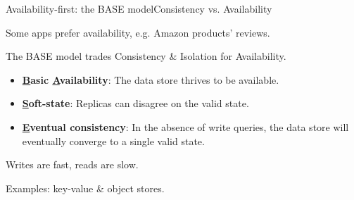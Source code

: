 \begin{frame}{Availability-first: the BASE model}{Consistency vs. Availability}


Some apps prefer availability, e.g. Amazon products' reviews.
\vfill 

The BASE model trades Consistency \& Isolation for Availability.



\vfill

\begin{itemize}
	\item \textbf{\underline{B}asic \underline{A}vailability}: 
	The data store thrives to be available.

	\item \textbf{\underline{S}oft-state}: 
	Replicas can disagree on the valid state.

	\item \textbf{\underline{E}ventual consistency}: 
	In the absence of write queries, 
	the data store will eventually converge to a single valid state.
\end{itemize}
\vfill\centering

Writes are fast, reads are slow.

\vfill\raggedright

Examples: key-value \& object stores.

\end{frame}

